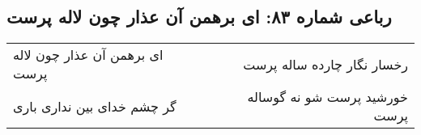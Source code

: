 \begin{center}
\section*{رباعی شماره ۸۳: ای برهمن آن عذار چون لاله پرست}
\label{sec:sh083}
\begin{longtable}{l p{0.5cm} r}
ای برهمن آن عذار چون لاله پرست
&&
رخسار نگار چارده ساله پرست
\\
گر چشم خدای بین نداری باری
&&
خورشید پرست شو نه گوساله پرست
\\
\end{longtable}
\end{center}
